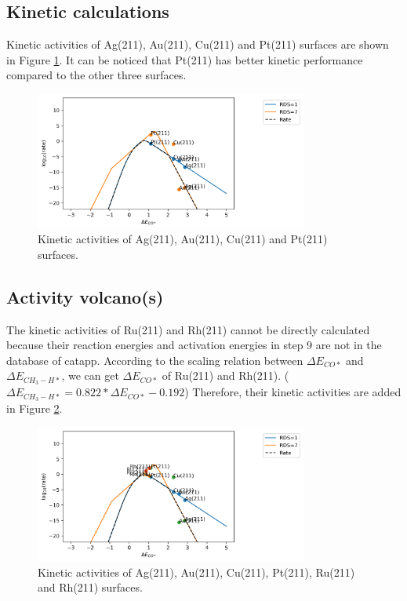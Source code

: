\documentclass{article}
\begin{document}
    \subsection*{Kinetic calculations}
    Kinetic activities of Ag(211), Au(211), Cu(211) and Pt(211) surfaces are shown in Figure \ref{fig:Kinetic_calculation}. It can be noticed that Pt(211) has better kinetic performance compared to the other three surfaces.
    \FloatBarrier
    \begin{figure}[!ht]
        \centering
        \includegraphics[width=0.8\textwidth]{Pictures/Kinetic_calculation.png}
        \caption{Kinetic activities of Ag(211), Au(211), Cu(211) and Pt(211) surfaces.}
        \label{fig:Kinetic_calculation}
    \end{figure}
    
    \subsection*{Activity volcano(s)}
    The kinetic activities of Ru(211) and Rh(211) cannot be directly calculated because their reaction energies and activation energies in step 9 are not in the database of catapp. According to the scaling relation between $\Delta E_{CO*}$ and $ \Delta E_{CH_3-H*}$, we can get $\Delta E_{CO*}$ of Ru(211) and Rh(211). ($\Delta E_{CH_3-H*} = 0.822 * \Delta E_{CO*} - 0.192$) Therefore, their kinetic activities are added in Figure \ref{fig:Activity_volcano}.
    \FloatBarrier
    \begin{figure}[!ht]
        \centering
        \includegraphics[width=0.8\textwidth]{Pictures/Activity_volcano.png}
        \caption{Kinetic activities of Ag(211), Au(211), Cu(211), Pt(211), Ru(211) and Rh(211) surfaces.}
        \label{fig:Activity_volcano}
    \end{figure}
\end{document}
